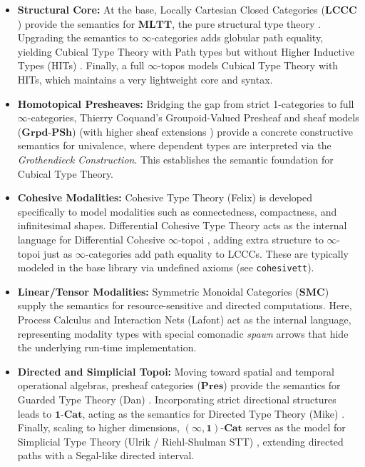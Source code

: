 \documentclass{article}
\theoremstyle{definition}
\theoremstyle{plain}
\begin{document}
\begin{itemize}
    \item \textbf{Structural Core:} At the base, Locally Cartesian Closed Categories ($\mathbf{LCCC}$) provide the semantics for $\mathbf{MLTT}$, the pure structural type theory \cite{Lof84}. Upgrading the semantics to $\infty$-categories adds globular path equality, yielding Cubical Type Theory with Path types but without Higher Inductive Types (HITs) \cite{cchm}. Finally, a full $\infty$-topos models Cubical Type Theory with HITs, which maintains a very lightweight core and syntax.
    \item \textbf{Homotopical Presheaves:} Bridging the gap from strict 1-categories to full $\infty$-categories, Thierry Coquand's Groupoid-Valued Presheaf and sheaf models ($\mathbf{Grpd}\text{-}\mathbf{PSh}$) \cite{coquand2021constructive} (with higher sheaf extensions \cite{Coq88}) provide a concrete constructive semantics for univalence, where dependent types are interpreted via the \emph{Grothendieck Construction}. This establishes the semantic foundation for Cubical Type Theory.
    \item \textbf{Cohesive Modalities:} Cohesive Type Theory (Felix) \cite{schreibershulman12cohesive} is developed specifically to model modalities such as connectedness, compactness, and infinitesimal shapes. Differential Cohesive Type Theory acts as the internal language for Differential Cohesive $\infty$-topoi \cite{schreiber13differential}, adding extra structure to $\infty$-topoi just as $\infty$-categories add path equality to LCCCs. These are typically modeled in the base library via undefined axioms (see \texttt{cohesivett}).
    \item \textbf{Linear/Tensor Modalities:} Symmetric Monoidal Categories ($\mathbf{SMC}$) supply the semantics for resource-sensitive and directed computations. Here, Process Calculus and Interaction Nets (Lafont) act as the internal language, representing modality types with special comonadic \emph{spawn} arrows that hide the underlying run-time implementation.
    \item \textbf{Directed and Simplicial Topoi:} Moving toward spatial and temporal operational algebras, presheaf categories ($\mathbf{Pres}$) provide the semantics for Guarded Type Theory (Dan) \cite{birkedal2011first}. Incorporating strict directional structures leads to $\mathbf{1\text{-}Cat}$, acting as the semantics for Directed Type Theory (Mike) \cite{Shulman15}. Finally, scaling to higher dimensions, $\mathbf{(\infty, 1)\text{-}Cat}$ serves as the model for Simplicial Type Theory (Ulrik / Riehl-Shulman STT) \cite{riehl2017type, gratzer2025yoneda}, extending directed paths with a Segal-like directed interval.
\end{itemize}
\end{document}
